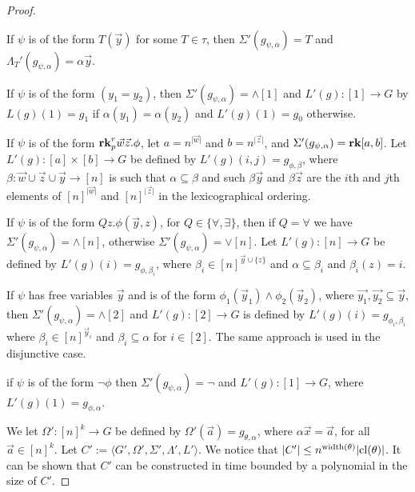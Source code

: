 \documentclass[../paper.tex]{subfiles}
\begin{document}
\begin{proof}
    \begin{itemizens}
    \item If $\psi$ is of the form $T(\vec{y})$ for some $T \in \tau$, then
      $\Sigma' (g_{\psi, \alpha}) = T$ and $\Lambda_T' (g_{\psi, \alpha}) =
      \alpha \vec{y}$.
    \item If $\psi$ is of the form $(y_1 = y_2)$, then $\Sigma' (g_{\psi,
        \alpha}) = \land[1]$ and $L'(g) : [1] \rightarrow G$ by $L(g)(1) = g_1$
      if $\alpha (y_1) = \alpha (y_2)$ and $L'(g)(1) = g_0$ otherwise.
    \item If $\psi$ is of the form $\text{\textbf{rk}}^r_p \vec{w} \vec{z}. \phi$, let $a =
      n^{\vert \vec{w}\vert}$ and $b = n^{\vert \vec{z}\vert}$, and $\Sigma'
      (g_{\psi, \alpha}) = \text{\textbf{rk}}[a, b]$. Let $L'(g) : [a] \times [b] \rightarrow
      G$ be defined by $L'(g)(i,j) = g_{\phi, \beta}$, where $\beta : \vec{w}
      \cup \vec{z} \cup \vec{y} \rightarrow [n]$ is such that $\alpha \subseteq
      \beta$ and such $\beta \vec{y}$ and $\beta \vec{z}$ are the $i$th and
      $j$th elements of $[n]^{\vert \vec{w} \vert}$ and $[n]^{\vert \vec{z}
        \vert}$ in the lexicographical ordering.
    \item If $\psi$ is of the form $Q z . \phi(\vec{y}, z)$, for $Q \in
      \{\forall, \exists\}$, then if $Q = \forall$ we have $\Sigma' (g_{\psi,
        \alpha}) = \land [n]$, otherwise $\Sigma' (g_{\psi, \alpha}) = \lor
      [n]$. Let $L'(g) : [n] \rightarrow G$ be defined by $L'(g)(i) = g_{\phi,
        \beta_i}$, where $\beta_i \in [n]^{\vec{y} \cup \{z\}}$ and $\alpha
      \subseteq \beta_i$ and $\beta_i (z) = i$.
    \item If $\psi$ has free variables $\vec{y}$ and is of the form $\phi_1
      (\vec{y}_1) \land \phi_2(\vec{y}_2)$, where $\vec{y_1}, \vec{y_2}
      \subseteq \vec{y}$, then $\Sigma'(g_{\psi, \alpha}) = \land[2]$ and $L'(g)
      : [2] \rightarrow G$ is defined by $L'(g)(i) = g_{\phi_i, \beta_i}$ where
      $\beta_i \in [n]^{\vec{y}_i}$ and $\beta_i \subseteq \alpha$ for $i \in
      [2]$. The same approach is used in the disjunctive case.
    \item if $\psi$ is of the form $\neg \phi$ then $\Sigma' (g_{\psi, \alpha})
      = \neg$ and $L'(g): [1] \rightarrow G$, where $L'(g)(1) = g_{\phi,
        \alpha}$.
    \end{itemizens}

    We let $\Omega' : [n]^k \rightarrow G$ be defined by $\Omega' (\vec{a}) =
    g_{\theta, \alpha}$, where $\alpha \vec{x} = \vec{a}$, for all $\vec{a} \in
    [n]^k$. Let $C' := \langle G', \Omega', \Sigma', \Lambda', L' \rangle$. We
    notice that $\vert C' \vert \leq n^{\mathrm{width}(\theta)} \vert \mathrm{cl}(\theta)
    \vert$. It can be shown that $C'$ can be constructed in time bounded by a
    polynomial in the size of $C'$.


\end{proof}
\end{document}
